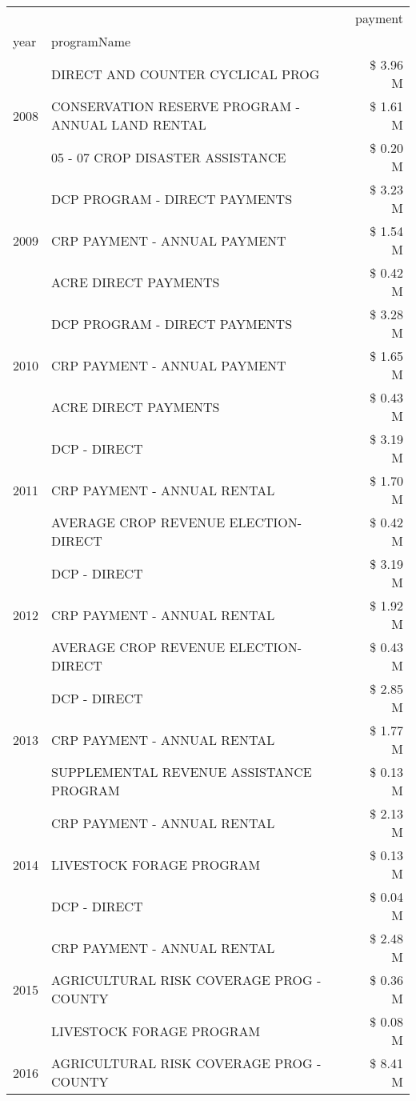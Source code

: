 \begin{tabular}{llr}
\toprule
 &  & payment \\
year & programName &  \\
\midrule
\multirow[t]{3}{*}{2008} & DIRECT AND COUNTER CYCLICAL PROG & \$ 3.96 M \\
 & CONSERVATION RESERVE PROGRAM - ANNUAL LAND RENTAL & \$ 1.61 M \\
 & 05 - 07 CROP DISASTER ASSISTANCE & \$ 0.20 M \\
\cline{1-3}
\multirow[t]{3}{*}{2009} & DCP PROGRAM - DIRECT PAYMENTS & \$ 3.23 M \\
 & CRP PAYMENT - ANNUAL PAYMENT & \$ 1.54 M \\
 & ACRE DIRECT PAYMENTS & \$ 0.42 M \\
\cline{1-3}
\multirow[t]{3}{*}{2010} & DCP PROGRAM - DIRECT PAYMENTS & \$ 3.28 M \\
 & CRP PAYMENT - ANNUAL PAYMENT & \$ 1.65 M \\
 & ACRE DIRECT PAYMENTS & \$ 0.43 M \\
\cline{1-3}
\multirow[t]{3}{*}{2011} & DCP - DIRECT & \$ 3.19 M \\
 & CRP PAYMENT - ANNUAL RENTAL & \$ 1.70 M \\
 & AVERAGE CROP REVENUE ELECTION-DIRECT & \$ 0.42 M \\
\cline{1-3}
\multirow[t]{3}{*}{2012} & DCP - DIRECT & \$ 3.19 M \\
 & CRP PAYMENT - ANNUAL RENTAL & \$ 1.92 M \\
 & AVERAGE CROP REVENUE ELECTION-DIRECT & \$ 0.43 M \\
\cline{1-3}
\multirow[t]{3}{*}{2013} & DCP - DIRECT & \$ 2.85 M \\
 & CRP PAYMENT - ANNUAL RENTAL & \$ 1.77 M \\
 & SUPPLEMENTAL REVENUE ASSISTANCE PROGRAM & \$ 0.13 M \\
\cline{1-3}
\multirow[t]{3}{*}{2014} & CRP PAYMENT - ANNUAL RENTAL & \$ 2.13 M \\
 & LIVESTOCK FORAGE PROGRAM & \$ 0.13 M \\
 & DCP - DIRECT & \$ 0.04 M \\
\cline{1-3}
\multirow[t]{3}{*}{2015} & CRP PAYMENT - ANNUAL RENTAL & \$ 2.48 M \\
 & AGRICULTURAL RISK COVERAGE PROG - COUNTY & \$ 0.36 M \\
 & LIVESTOCK FORAGE PROGRAM & \$ 0.08 M \\
\cline{1-3}
\multirow[t]{3}{*}{2016} & AGRICULTURAL RISK COVERAGE PROG - COUNTY      & \$ 8.41 M \\

\end{tabular}
